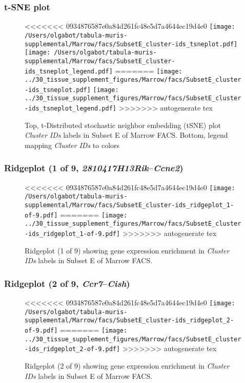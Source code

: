 \subsubsection{t-SNE plot}
\begin{figure}[h]
\centering
<<<<<<< 0934876587e0a84d261fc48e5d7a4644ec19d4e0
\texttt{[image: /Users/olgabot/tabula-muris-supplemental/Marrow/facs/SubsetE\_cluster-ids\_tsneplot.pdf]}
\texttt{[image: /Users/olgabot/tabula-muris-supplemental/Marrow/facs/SubsetE\_cluster-ids\_tsneplot\_legend.pdf]}
=======
\texttt{[image: ../30\_tissue\_supplement\_figures/Marrow/facs/SubsetE\_cluster-ids\_tsneplot.pdf]}
\texttt{[image: ../30\_tissue\_supplement\_figures/Marrow/facs/SubsetE\_cluster-ids\_tsneplot\_legend.pdf]}
>>>>>>> autogenerate tex
\caption{Top, t-Distributed stochastic neighbor embedding (tSNE) plot  \emph{Cluster IDs} labels in Subset E of Marrow FACS. Bottom, legend mapping \emph{Cluster IDs} to colors}
\end{figure}


\clearpage

\subsubsection{Ridgeplot (1 of 9, \emph{2810417H13Rik}--\emph{Ccne2})}
\begin{figure}[h]
\centering
<<<<<<< 0934876587e0a84d261fc48e5d7a4644ec19d4e0
\texttt{[image: /Users/olgabot/tabula-muris-supplemental/Marrow/facs/SubsetE\_cluster-ids\_ridgeplot\_1-of-9.pdf]}
=======
\texttt{[image: ../30\_tissue\_supplement\_figures/Marrow/facs/SubsetE\_cluster-ids\_ridgeplot\_1-of-9.pdf]}
>>>>>>> autogenerate tex

\caption{ Ridgeplot (1 of 9)  showing gene expression enrichment in \emph{Cluster IDs} labels in Subset E of Marrow FACS. }
\end{figure}


\clearpage

\subsubsection{Ridgeplot (2 of 9, \emph{Ccr7}--\emph{Cish})}
\begin{figure}[h]
\centering
<<<<<<< 0934876587e0a84d261fc48e5d7a4644ec19d4e0
\texttt{[image: /Users/olgabot/tabula-muris-supplemental/Marrow/facs/SubsetE\_cluster-ids\_ridgeplot\_2-of-9.pdf]}
=======
\texttt{[image: ../30\_tissue\_supplement\_figures/Marrow/facs/SubsetE\_cluster-ids\_ridgeplot\_2-of-9.pdf]}
>>>>>>> autogenerate tex

\caption{ Ridgeplot (2 of 9)  showing gene expression enrichment in \emph{Cluster IDs} labels in Subset E of Marrow FACS. }
\end{figure}


